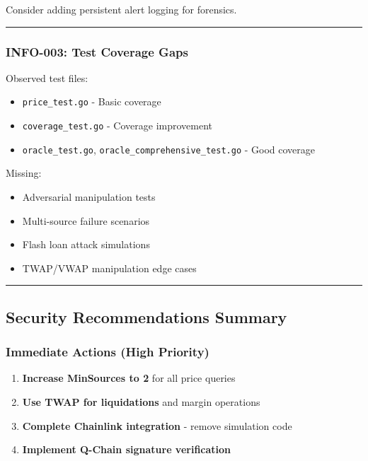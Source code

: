 \documentclass[
]{article}
\providecommand{\tightlist}{%
  \setlength{\itemsep}{0pt}\setlength{\parskip}{0pt}}
\begin{document}
Consider adding persistent alert logging for forensics.

\begin{center}\rule{0.5\linewidth}{0.5pt}\end{center}

\subsubsection{INFO-003: Test Coverage
Gaps}\label{info-003-test-coverage-gaps}

Observed test files:

\begin{itemize}
\tightlist
\item
  \texttt{price\_test.go} - Basic coverage
\item
  \texttt{coverage\_test.go} - Coverage improvement
\item
  \texttt{oracle\_test.go}, \texttt{oracle\_comprehensive\_test.go} -
  Good coverage
\end{itemize}

Missing:

\begin{itemize}
\tightlist
\item
  Adversarial manipulation tests
\item
  Multi-source failure scenarios
\item
  Flash loan attack simulations
\item
  TWAP/VWAP manipulation edge cases
\end{itemize}

\begin{center}\rule{0.5\linewidth}{0.5pt}\end{center}

\subsection{Security Recommendations
Summary}\label{security-recommendations-summary}

\subsubsection{Immediate Actions (High
Priority)}\label{immediate-actions-high-priority}

\begin{enumerate}
\def\labelenumi{\arabic{enumi}.}
\tightlist
\item
  \textbf{Increase MinSources to 2} for all price queries
\item
  \textbf{Use TWAP for liquidations} and margin operations
\item
  \textbf{Complete Chainlink integration} - remove simulation code
\item
  \textbf{Implement Q-Chain signature verification}
\end{enumerate}
\end{document}
